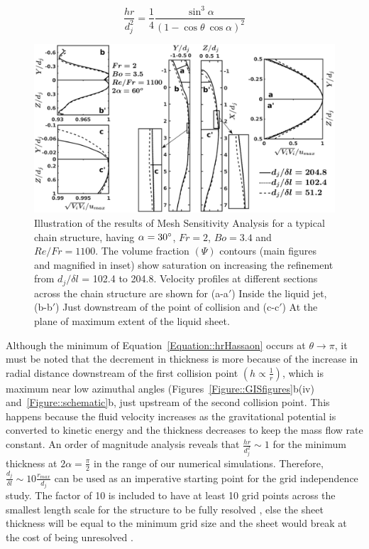 \documentclass[%
aip,
sd,%
amsmath,amssymb,
preprint,%
author-year,%
]{revtex4-1}
\begin{document}
\begin{equation}\label{Equation::hrHassaon}
\frac{hr}{d_j^2} = 	\frac{1}{4}\frac{\sin^3\alpha}{(1-\cos\theta\:\cos\alpha)^2}
\end{equation}
\begin{figure}
	\centering
	\includegraphics[width=\linewidth]{gis}
	\caption{Illustration of the results of Mesh Sensitivity Analysis for a typical chain structure, having $\alpha = 30\degree$, $Fr = 2$, $Bo = 3.4$ and $Re/Fr = 1100$. The volume fraction $\left(\Psi\right)$ contours (main figures and magnified in inset) show saturation on increasing the refinement from $d_j/\delta l$ = 102.4 to 204.8. Velocity profiles at different sections across the chain structure are shown for (a-a$'$) Inside the liquid jet, (b-b$'$) Just downstream of the point of collision  and (c-c$'$) At the plane of maximum extent of the liquid sheet.}
	\label{Figure::GISplots}
\end{figure}
Although the minimum of Equation~\ref{Equation::hrHassaon} occurs at $\theta \to \pi$, it must be noted that the decrement in thickness is more because of the increase in radial distance downstream of the first collision point $\left(h \propto \frac{1}{r}\right)$, which is maximum near low azimuthal angles (Figures~\ref{Figure::GISfigures}b(iv) and~\ref{Figure::schematic}b, just upstream of the second collision point. This happens because the fluid velocity increases as the gravitational potential is converted to kinetic energy and the thickness decreases to keep the mass flow rate constant. An order of magnitude analysis reveals that $\frac{hr}{d_j^2} \sim 1$ for the minimum thickness at $2\alpha = \frac{\pi}{2}$ in the range of our numerical simulations. Therefore, $\frac{d_j}{\delta l} \sim 10\frac{r_{max}}{d_j}$ can be used as an imperative starting point for the grid independence study. The factor of 10 is included to have at least 10 grid points across the smallest length scale for the structure to be fully resolved \citep{ling2015multiscale}, else the sheet thickness will be equal to the minimum grid size and the sheet would break at the cost of being unresolved \citep{chen2013high}.
\end{document}
